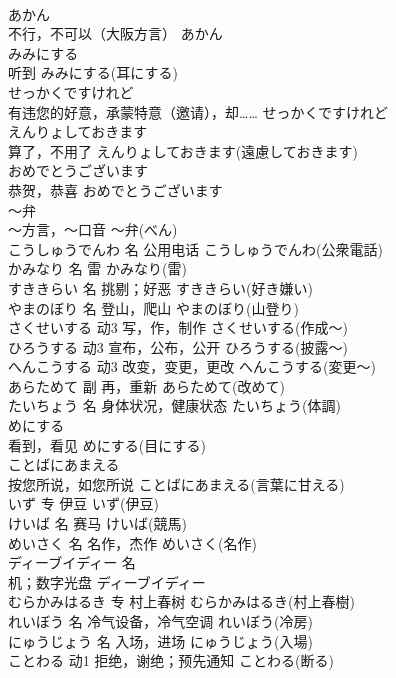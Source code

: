 \documentclass[8pt]{extreport}
\begin{document}
\begin{CJK}{UTF8}{min}
\\	あかん	
\\	不行，不可以（大阪方言）	あかん	
\\	みみにする	
\\	听到	みみにする(耳にする)	
\\	せっかくですけれど	
\\	有违您的好意，承蒙特意（邀请），却……	せっかくですけれど	
\\	えんりょしておきます	
\\	算了，不用了	えんりょしておきます(遠慮しておきます)	
\\	おめでとうございます	
\\	恭贺，恭喜	おめでとうございます	
\\	～弁	
\\	～方言，～口音	～弁(べん)	
\\	こうしゅうでんわ	名	公用电话	こうしゅうでんわ(公衆電話)	
\\	かみなり	名	雷	かみなり(雷)	
\\	すききらい	名	挑剔；好恶	すききらい(好き嫌い)	
\\	やまのぼり	名	登山，爬山	やまのぼり(山登り)	
\\	さくせいする	动3	写，作，制作	さくせいする(作成～)	
\\	ひろうする	动3	宣布，公布，公开	ひろうする(披露～)	
\\	へんこうする	动3	改变，变更，更改	へんこうする(変更～)	
\\	あらためて	副	再，重新	あらためて(改めて)	
\\	たいちょう	名	身体状况，健康状态	たいちょう(体調)	
\\	めにする	
\\	看到，看见	めにする(目にする)	
\\	ことばにあまえる	
\\	按您所说，如您所说	ことばにあまえる(言葉に甘える)	
\\	いず	专	伊豆	いず(伊豆)	
\\	けいば	名	赛马	けいば(競馬)	
\\	めいさく	名	名作，杰作	めいさく(名作)	
\\	ディーブイディー	名	
\\	机；数字光盘	ディーブイディー
\\	むらかみはるき	专	村上春树	むらかみはるき(村上春樹)	
\\	れいぼう	名	冷气设备，冷气空调	れいぼう(冷房)	
\\	にゅうじょう	名	入场，进场	にゅうじょう(入場)	
\\	ことわる	动1	拒绝，谢绝；预先通知	ことわる(断る)	

\end{CJK}
\end{document}
